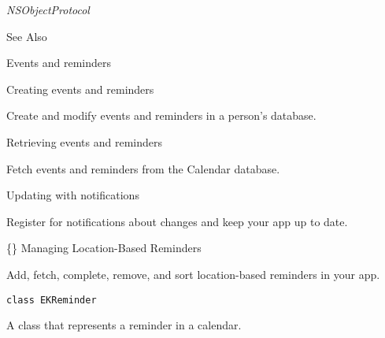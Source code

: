 \documentclass{article}
\begin{document}
\textit{NSObjectProtocol}

See Also

Events and reminders

Creating events and reminders

Create and modify events and reminders in a person's database.

Retrieving events and reminders

Fetch events and reminders from the Calendar database.

Updating with notifications

Register for notifications about changes and keep your app up to date.

\{\} Managing Location-Based Reminders

Add, fetch, complete, remove, and sort location-based reminders in your app.

\texttt{class EKReminder}

A class that represents a reminder in a calendar.

\newpage
\end{document}
